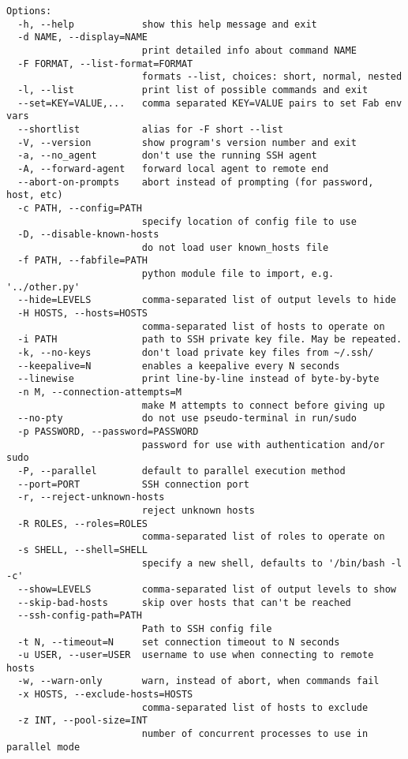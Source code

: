 \documentclass[justified,sixbynine]{tufte-book}
\theoremstyle{plain}%
\theoremstyle{definition}
\theoremstyle{remark}
\begin{document}
\begin{fullwidth}
\begin{lstlisting}
Options:
  -h, --help            show this help message and exit
  -d NAME, --display=NAME
                        print detailed info about command NAME
  -F FORMAT, --list-format=FORMAT
                        formats --list, choices: short, normal, nested
  -l, --list            print list of possible commands and exit
  --set=KEY=VALUE,...   comma separated KEY=VALUE pairs to set Fab env vars
  --shortlist           alias for -F short --list
  -V, --version         show program's version number and exit
  -a, --no_agent        don't use the running SSH agent
  -A, --forward-agent   forward local agent to remote end
  --abort-on-prompts    abort instead of prompting (for password, host, etc)
  -c PATH, --config=PATH
                        specify location of config file to use
  -D, --disable-known-hosts
                        do not load user known_hosts file
  -f PATH, --fabfile=PATH
                        python module file to import, e.g. '../other.py'
  --hide=LEVELS         comma-separated list of output levels to hide
  -H HOSTS, --hosts=HOSTS
                        comma-separated list of hosts to operate on
  -i PATH               path to SSH private key file. May be repeated.
  -k, --no-keys         don't load private key files from ~/.ssh/
  --keepalive=N         enables a keepalive every N seconds
  --linewise            print line-by-line instead of byte-by-byte
  -n M, --connection-attempts=M
                        make M attempts to connect before giving up
  --no-pty              do not use pseudo-terminal in run/sudo
  -p PASSWORD, --password=PASSWORD
                        password for use with authentication and/or sudo
  -P, --parallel        default to parallel execution method
  --port=PORT           SSH connection port
  -r, --reject-unknown-hosts
                        reject unknown hosts
  -R ROLES, --roles=ROLES
                        comma-separated list of roles to operate on
  -s SHELL, --shell=SHELL
                        specify a new shell, defaults to '/bin/bash -l -c'
  --show=LEVELS         comma-separated list of output levels to show
  --skip-bad-hosts      skip over hosts that can't be reached
  --ssh-config-path=PATH
                        Path to SSH config file
  -t N, --timeout=N     set connection timeout to N seconds
  -u USER, --user=USER  username to use when connecting to remote hosts
  -w, --warn-only       warn, instead of abort, when commands fail
  -x HOSTS, --exclude-hosts=HOSTS
                        comma-separated list of hosts to exclude
  -z INT, --pool-size=INT
                        number of concurrent processes to use in parallel mode
\end{lstlisting}


\end{fullwidth}
\end{document}
